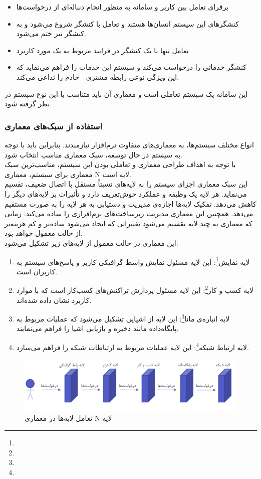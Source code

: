 \documentclass[12pt]{article}
\begin{document}
	\begin{itemize}
		\item برقرای تعامل بین کاربر و سامانه به منظور انجام دنباله‌ای از درخواست‌ها
		\item کنشگرهای این سیستم انسان‌ها هستند و تعامل با کنشگر شروع می‌شود و به کنشگر نیز ختم می‌شود.
		\item تعامل تنها با یک کنشگر در فرایند مربوط به یک مورد کاربرد
		\item کنشگر خدماتی را درخواست می‌کند و سیستم این خدمات را فراهم می‌نماید که این ویژگی نوعی رابطه مشتری - خادم را تداعی می‌کند.
	\end{itemize}
	این سامانه یک سیستم تعاملی است و معماری آن باید متناسب با این نوع سیستم در نظر گرفته شود.

	\subsubsection{استفاده از سبک‌های معماری}
	انواع مختلف سیستم‌ها، به معماری‌های متفاوت نرم‌افزار نیازمندند. بنابراین باید با توجه به سیستم در حال توسعه، سبک معماری مناسب انتخاب شود.\\
	با توجه به اهداف طراحی معماری و تعاملی بودن این سیستم، مناسب‌ترین سبک معماری برای سیستم، معماری N لایه است.\\
	این سبک معماری اجزای سیستم را به لایه‌های نسبتاً مستقل با اتصال ضعیف، تقسیم می‌نماید. هر لایه یک وظیفه و عملکرد خوش‌تعریف دارد و تأثیرات بر لایه‌های دیگر را کاهش می‌دهد. تفکیک لایه‌ها اجازه‌ی مدیریت و دستیابی به هر لایه را به صورت مستقیم می‌دهد. همچنین این معماری مدیریت زیرساخت‌های نرم‌افزاری را ساده می‌کند. زمانی که معماری به چند لایه تقسیم می‌شود تغییراتی که ایجاد می‌شود ساده‌تر و کم هزینه‌تر از حالت معمول خواهد بود.\\
	این معماری در حالت معمول از لایه‌های زیر تشکیل می‌شود:
	\begin{enumerate}
		\item لایه نمایش\footnote{}:
		این لایه مسئول نمایش واسط گرافیکی کاربر و پاسخ‌های سیستم به کاربران است.
		\item لایه کسب و کار\footnote{}:
		این لایه مسئول پردازش تراکنش‌های کسب‌کار است که با موارد کاربرد نشان داده شده‌اند.
		\item لایه انباره‌ی مانا\footnote{}:
		این لایه از اشیایی تشکیل می‌شود که عملیات مربوط به پایگاه‌داده مانند ذخیره و بازیابی اشیا را فراهم می‌نمایند.
		\item لایه ارتباط شبکه\footnote{}:
		این لایه عملیات مربوط به ارتباطات شبکه را فراهم می‌سازد.
	\end{enumerate}
	\begin{figure}[H]
		\centering
		\includegraphics[width=0.9\linewidth]{files/2}
		\caption{تعامل لایه‌ها در معماری N لایه}
		\label{fig:2}
	\end{figure}
\end{document}
